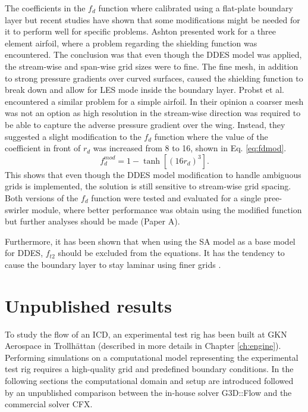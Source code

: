 The coefficients in the $f_d$ function where calibrated using a flat-plate boundary layer but recent studies have shown that some modifications might be needed for it to perform well for specific problems. Ashton \cite{Ashton2016} presented work for a three element airfoil, where a problem regarding the shielding function was encountered. The conclusion was that even though the DDES model was applied, the stream-wise and span-wise grid sizes were to fine. The fine mesh, in addition to strong pressure gradients over curved surfaces, caused the shielding function to break down and allow for LES mode inside the boundary layer. Probst et al. \cite{Probst2010} encountered a similar problem for a simple airfoil. In their opinion a coarser mesh was not an option as high resolution in the stream-wise direction was required to be able to capture the adverse pressure gradient over the wing. Instead, they suggested a slight modification to the $f_d$ function where the value of the coefficient in front of $r_d$ was increased from 8 to 16, shown in Eq. \ref{eq:fdmod}. 
\begin{equation}
  f_d^{mod} = 1-\tanh\left[(16r_d)^3\right].
  \label{eq:fdmod}
\end{equation}
This shows that even though the DDES model modification to handle ambiguous grids is implemented, the solution is still sensitive to stream-wise grid spacing. Both versions of the $f_d$ function were tested and evaluated for a single pree-swirler module, where better performance was obtain using the modified function but further analyses should be made (Paper A).

Furthermore, it has been shown that when using the SA model as a base model for DDES, $f_{t2}$ should be excluded from the equations. It has the tendency to cause the boundary layer to stay laminar using finer grids \cite{Vatsa2017}.



%
\chapter{Unpublished results\label{ch:sim}}%
To study the flow of an ICD, an experimental test rig has been built at GKN Aerospace in Trollhättan (described in more details in Chapter \ref{ch:engine}). Performing simulations on a computational model representing the experimental test rig requires a high-quality grid and predefined boundary conditions. In the following sections the computational domain and setup are introduced followed by an unpublished comparison between the in-house solver G3D::Flow and the commercial solver CFX.

